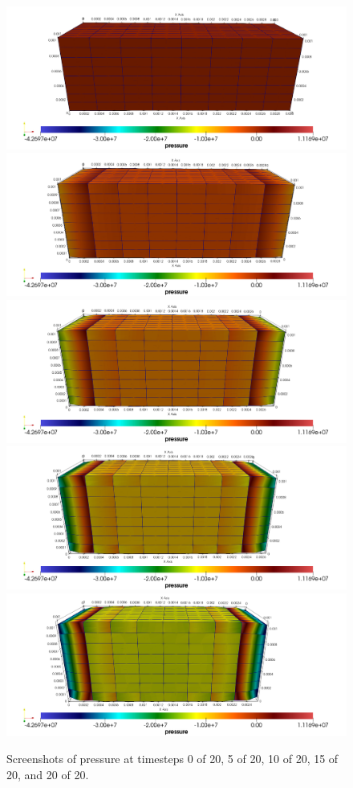 \documentclass[letterpaper,11pt,oneside,titlepage]{report}
\begin{document}
{\begin{figure}
  \centering
  \includegraphics[height=0.18\textheight]{figs/00-p.png}
  \includegraphics[height=0.18\textheight]{figs/05-p.png}
  \includegraphics[height=0.18\textheight]{figs/10-p.png}
  \includegraphics[height=0.18\textheight]{figs/15-p.png}
  \includegraphics[height=0.18\textheight]{figs/20-p.png}
  \caption{Screenshots of pressure at timesteps 0 of 20, 5 of 20, 10 of 20, 15 of 20, and 20 of 20.}
\end{figure}

}
\end{document}
